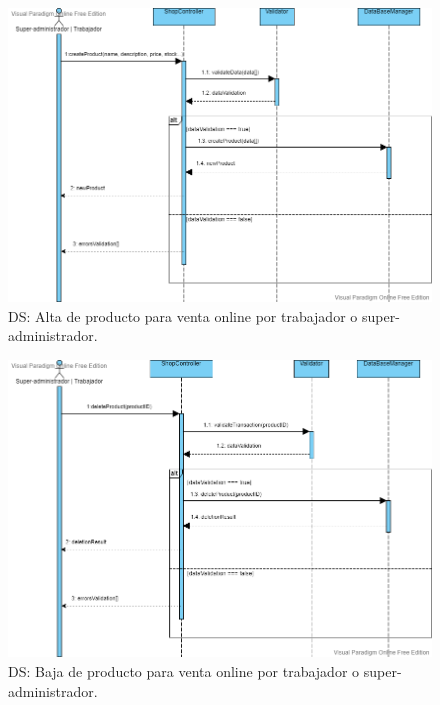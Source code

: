 \begin{figure}[H]
  \centering
  \includegraphics[scale=0.38]{images/Alta_Producto.png}
  \caption{DS: Alta de producto para venta online por trabajador o super-administrador.}
  \label{DS1}
\end{figure}

\begin{figure}[H]
  \centering
  \includegraphics[scale=0.38]{images/Baja_Producto.png}
  \caption{DS: Baja de producto para venta online por trabajador o super-administrador.}
  \label{DS1}
\end{figure}

